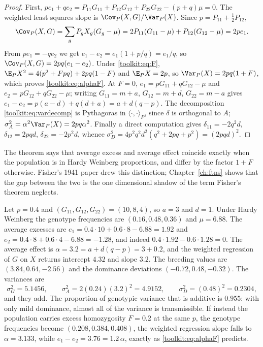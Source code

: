 \begin{proof}
First, $pe_1+qe_2=P_{11}G_{11}+P_{12}G_{12}+P_{22}G_{22}-(p+q)\mu=0$. The weighted least squares
slope is $\Cov_P(X,G)/\Var_P(X)$. Since $p=P_{11}+\tfrac12P_{12}$,
\[
\Cov_P(X,G)=\sum_gP_gX_g(G_g-\mu)=2P_{11}(G_{11}-\mu)+P_{12}(G_{12}-\mu)=2pe_1 .
\]
From $pe_1=-qe_2$ we get $e_1-e_2=e_1(1+p/q)=e_1/q$, so $\Cov_P(X,G)=2pq(e_1-e_2)$. Under
\eqref{toolkit:eq:F}, $\E_PX^2=4(p^2+Fpq)+2pq(1-F)$ and $\E_PX=2p$, so
$\Var_P(X)=2pq(1+F)$, which proves \eqref{toolkit:eq:alphaF}. At $F=0$,
$e_1=pG_{11}+qG_{12}-\mu$ and $e_2=pG_{12}+qG_{22}-\mu$; writing $G_{11}=m+a$, $G_{12}=m+d$,
$G_{22}=m-a$ gives $e_1-e_2=p(a-d)+q(d+a)=a+d(q-p)$. The decomposition
\eqref{toolkit:eq:vardecomp} is Pythagoras in $\langle\cdot,\cdot\rangle_P$, since $\delta$ is
orthogonal to $A$; $\sigma^2_A=\alpha^2\Var_P(X)=2pq\alpha^2$. Finally a direct computation gives
$\delta_{11}=-2q^2d$, $\delta_{12}=2pqd$, $\delta_{22}=-2p^2d$, whence
$\sigma^2_D=4p^2q^2d^2(q^2+2pq+p^2)=(2pqd)^2$.
\end{proof}

The theorem says that average excess and average effect coincide exactly when the population is
in Hardy Weinberg proportions, and differ by the factor $1+F$ otherwise. Fisher's 1941 paper drew
this distinction; Chapter~\ref{ch:ftns} shows that the gap between the two is the one dimensional
shadow of the term Fisher's theorem neglects.

\begin{example}\label{toolkit:ex:avg}
Let $p=0.4$ and $(G_{11},G_{12},G_{22})=(10,8,4)$, so $a=3$ and $d=1$. Under Hardy Weinberg the
genotype frequencies are $(0.16,0.48,0.36)$ and $\mu=6.88$. The average excesses are
$e_1=0.4\cdot10+0.6\cdot8-6.88=1.92$ and $e_2=0.4\cdot8+0.6\cdot4-6.88=-1.28$, and indeed
$0.4\cdot1.92-0.6\cdot1.28=0$. The average effect is $\alpha=3.2=a+d(q-p)=3+0.2$, and the
weighted regression of $G$ on $X$ returns intercept $4.32$ and slope $3.2$. The breeding values
are $(3.84,0.64,-2.56)$ and the dominance deviations $(-0.72,0.48,-0.32)$. The variances are
\[
\sigma^2_G=5.1456,\qquad \sigma^2_A=2(0.24)(3.2)^2=4.9152,\qquad \sigma^2_D=(0.48)^2=0.2304,
\]
and they add. The proportion of genotypic variance that is additive is $0.955$: with only mild
dominance, almost all of the variance is transmissible. If instead the population carries excess
homozygosity $F=0.2$ at the same $p$, the genotype frequencies become $(0.208,0.384,0.408)$, the
weighted regression slope falls to $\alpha=3.133$, while $e_1-e_2=3.76=1.2\,\alpha$, exactly as
\eqref{toolkit:eq:alphaF} predicts.
\end{example}

